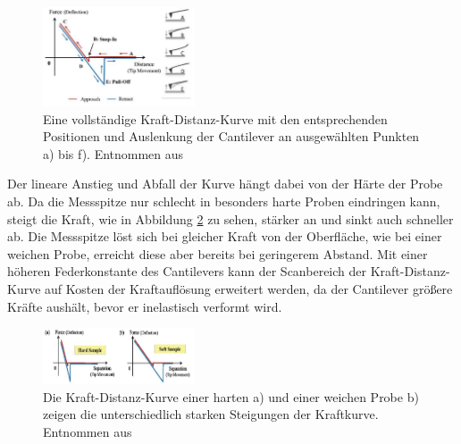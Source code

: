           \FloatBarrier

          \begin{figure}[h]
            \centering
            \includegraphics[width = 0.4\textwidth]{pictures/forcedist.png}
            \caption{Eine vollständige Kraft-Distanz-Kurve mit den entsprechenden Positionen und Auslenkung der Cantilever an ausgewählten Punkten a) bis f). Entnommen aus \cite{park_systems_force-distance_nodate}}
            \label{fig:forcedist}
          \end{figure}
        
          \FloatBarrier
          
          Der lineare Anstieg und Abfall der Kurve hängt dabei von der Härte der Probe ab. Da die Messspitze nur schlecht in besonders harte Proben eindringen kann, steigt die Kraft, wie in Abbildung \ref{fig:force_hard_soft} zu sehen, stärker an und sinkt auch schneller ab. Die Messspitze löst sich
          bei gleicher Kraft von der Oberfläche, wie bei einer weichen Probe, erreicht diese aber bereits bei geringerem Abstand. Mit einer höheren Federkonstante des Cantilevers kann der Scanbereich der
          Kraft-Distanz-Kurve auf Kosten der Kraftauflösung erweitert werden, da der Cantilever größere Kräfte aushält, bevor er inelastisch verformt wird.





          \begin{figure}[h]
            \centering
            \includegraphics[width = 0.4\textwidth]{pictures/force_hard_soft.png}
            \caption{Die Kraft-Distanz-Kurve einer harten a) und einer weichen Probe b) zeigen die unterschiedlich starken Steigungen der Kraftkurve. Entnommen aus \cite{park_systems_force-distance_nodate}}
            \label{fig:force_hard_soft}
          \end{figure}


